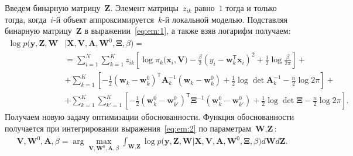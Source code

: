 \documentclass[12pt, twoside]{article}
\numberwithin{equation}{section}
\begin{document}
Введем бинарную матрицу~$\mathbf{Z}$. Элемент матрицы~$z_{ik}$ равно~$1$ тогда и только тогда, когда~$i$-й объект аппроксимируется~$k$-й локальной моделью.
Подставляя бинарную матрицу~$\mathbf{Z}$ в выражении~\eqref{eq:em:1}, а также взяв логарифм получаем:
\[
\label{eq:em:2}
\begin{aligned}
\log p\bigr(\mathbf{y}, \mathbf{Z}, \mathbf{W}&|\mathbf{X}, \mathbf{V}, \textbf{A}, \textbf{W}^{0},  \bm{\Xi}, \beta\bigr) =\\
&= \sum_{i=1}^{N}\sum_{k=1}^{K}z_{ik}\left[\log\pi_k\bigr(\textbf{x}_i, \textbf{V}\bigr) - \frac{\beta}{2}\left(y_{i} - \textbf{w}_{k}^{\mathsf{T}}\textbf{x}_{i}\right)^{2} + \frac{1}{2}\log\frac{\beta}{2\pi}\right] +\\
&+ \sum_{k=1}^{K}\left[-\frac{1}{2}\left(\textbf{w}_{k} - \textbf{w}_{k}^{0}\right)^{\mathsf{T}}\textbf{A}_{k}^{-1}\left(\textbf{w}_{k} - \textbf{w}_{k}^{0}\right) + \frac{1}{2}\log\det\textbf{A}^{-1}_{k} - \frac{n}{2}\log2\pi\right]+\\
&+ \sum_{k=1}^{K}\sum_{k'=1}^{K}\left[-\frac{1}{2}\left(\textbf{w}_{k}^{0}-\textbf{w}_{k'}^{0}\right)^{\mathsf{T}}\bm{\Xi}^{-1}\left(\textbf{w}_{k}^{0}-\textbf{w}_{k'}^{0}\right) +\frac{1}{2}\log\det \bm{\Xi} -\frac{n}{2}\log{2\pi}\right].
\end{aligned}
\]
Получаем новую задачу оптимизации обоснованности. Функция обоснованности получается при интегрировании выражения~\eqref{eq:em:2} по параметрам~$\textbf{W}, \textbf{Z}$:
\[
\label{eq:em:3}
\begin{aligned}
\mathbf{V}, \mathbf{W}^0, \textbf{A},  \beta = \arg\max_{\mathbf{V}, \mathbf{W}^0, \textbf{A}, \beta} \int_{\textbf{W}, \textbf{Z}}\log p\bigr(\mathbf{y}, \textbf{Z}, \textbf{W}|\mathbf{X}, \mathbf{V}, \textbf{A}, \textbf{W}^{0}, \bm{\Xi}, \beta\bigr)d\textbf{W}d\textbf{Z}.
\end{aligned}
\]
\end{document}
